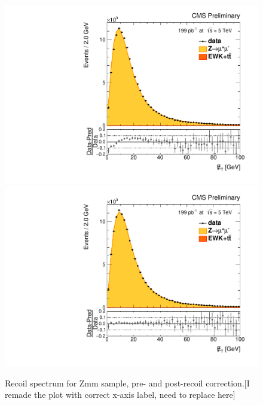 \begin{figure}
\centering
\includegraphics[width=0.49\linewidth]{plots/Recoil/close_nocorr_13/fitrecoilp.pdf}
\includegraphics[width=0.49\linewidth]{plots/Recoil/close_corr_13/fitrecoilp.pdf}
\caption{Recoil spectrum for Zmm sample, pre- and post-recoil correction.[I remade the plot with correct x-axis label, need to replace here]}
\label{fig:recoil:validation:recoil}
\end{figure}
